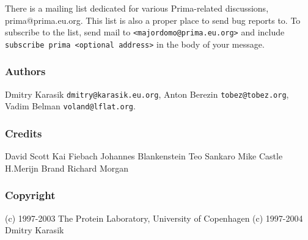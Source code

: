 \documentclass{report}
\begin{document}
There is a mailing list dedicated for various Prima-related discussions, 
prima@prima.eu.org. This list is also a proper place to send bug reports to. 
To subscribe to the list, send mail to \texttt{<majordomo@prima.eu.org>} and 
include \texttt{subscribe prima <optional address>} in the body of your message.

\subsubsection{Authors}

Dmitry Karasik \texttt{dmitry@karasik.eu.org},
Anton Berezin \texttt{tobez@tobez.org},
Vadim Belman \texttt{voland@lflat.org}.

\subsubsection{Credits}

David Scott
Kai Fiebach
Johannes Blankenstein
Teo Sankaro
Mike Castle
H.Merijn Brand
Richard Morgan

\subsubsection{Copyright}

(c) 1997-2003 The Protein Laboratory, University of Copenhagen
(c) 1997-2004 Dmitry Karasik
\end{document}
